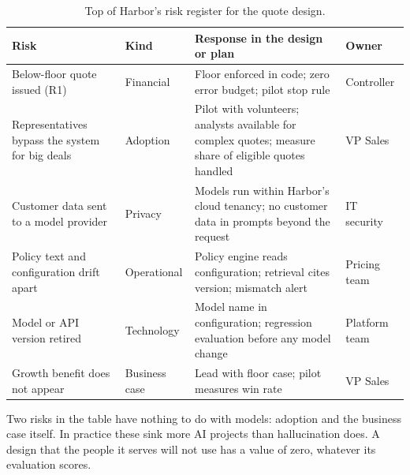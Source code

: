 \begin{table}[htbp]
\centering
\small
\caption{Top of Harbor's risk register for the quote design.}
\label{tab:risk}
\begin{tabularx}{\textwidth}{@{}>{\raggedright\arraybackslash}p{3.1cm}>{\raggedright\arraybackslash}p{1.8cm}>{\raggedright\arraybackslash}X>{\raggedright\arraybackslash}p{1.9cm}@{}}
\toprule
Risk & Kind & Response in the design or plan & Owner \\
\midrule
Below-floor quote issued (\textsf{R1}) & Financial & Floor enforced in code; zero error budget; pilot stop rule & Controller \\
Representatives bypass the system for big deals & Adoption & Pilot with volunteers; analysts available for complex quotes; measure share of eligible quotes handled & VP Sales \\
Customer data sent to a model provider & Privacy & Models run within Harbor's cloud tenancy; no customer data in prompts beyond the request & IT security \\
Policy text and configuration drift apart & Operational & Policy engine reads configuration; retrieval cites version; mismatch alert & Pricing team \\
Model or API version retired & Technology & Model name in configuration; regression evaluation before any model change & Platform team \\
Growth benefit does not appear & Business case & Lead with floor case; pilot measures win rate & VP Sales \\
\bottomrule
\end{tabularx}
\end{table}

Two risks in the table have nothing to do with models: adoption and the business case itself. In practice these sink more AI projects than hallucination does. A design that the people it serves will not use has a value of zero, whatever its evaluation scores.
